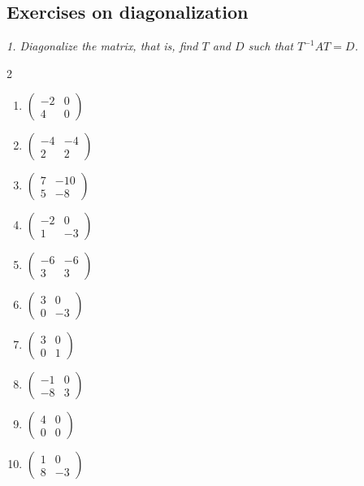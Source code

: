 \subsection{Exercises on diagonalization}

\emph{1. Diagonalize the matrix, that is, find $T$ and $D$ such that
$T^{-1}AT=D$.}
\bigskip
\begin{multicols}{2}\raggedright
\begin{enumerate}[label=\arabic*., leftmargin=*]
\item $\begin{pmatrix}-2 & 0\\ 4 & 0\end{pmatrix}$
\item $\begin{pmatrix}-4 & -4\\ 2 & 2\end{pmatrix}$
\item $\begin{pmatrix}7 & -10\\ 5 & -8\end{pmatrix}$
\item $\begin{pmatrix}-2 & 0\\ 1 & -3\end{pmatrix}$
\item $\begin{pmatrix}-6 & -6\\ 3 & 3\end{pmatrix}$
\item $\begin{pmatrix}3 & 0\\ 0 & -3\end{pmatrix}$
\item $\begin{pmatrix}3 & 0\\ 0 & 1\end{pmatrix}$
\item $\begin{pmatrix}-1 & 0\\ -8 & 3\end{pmatrix}$
\item $\begin{pmatrix}4 & 0\\ 0 & 0\end{pmatrix}$
\item $\begin{pmatrix}1 & 0\\ 8 & -3\end{pmatrix}$

\end{enumerate}
\end{multicols}
